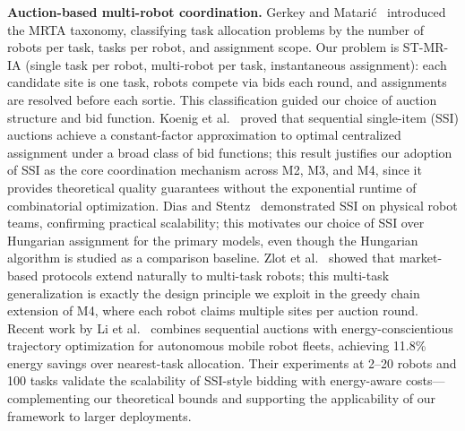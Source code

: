 \documentclass[conference]{IEEEtran}
\begin{document}
\textbf{Auction-based multi-robot coordination.}
Gerkey and Matari\'{c}~\cite{Gerkey2004} introduced the MRTA taxonomy,
classifying task allocation problems by the number of robots per task, tasks
per robot, and assignment scope.
Our problem is ST-MR-IA (single task per robot, multi-robot per task,
instantaneous assignment): each candidate site is one task, robots compete
via bids each round, and assignments are resolved before each sortie.
This classification guided our choice of auction structure and bid function.
Koenig et al.~\cite{Koenig2006} proved that sequential single-item (SSI)
auctions achieve a constant-factor approximation to optimal centralized
assignment under a broad class of bid functions; this result justifies our
adoption of SSI as the core coordination mechanism across M2, M3, and M4,
since it provides theoretical quality guarantees without the exponential
runtime of combinatorial optimization.
Dias and Stentz~\cite{Dias2006} demonstrated SSI on physical robot teams,
confirming practical scalability; this motivates our choice of SSI over
Hungarian assignment for the primary models, even though the Hungarian
algorithm is studied as a comparison baseline.
Zlot et al.~\cite{Zlot2002} showed that market-based protocols extend
naturally to multi-task robots; this multi-task generalization is exactly
the design principle we exploit in the greedy chain extension of M4, where
each robot claims multiple sites per auction round.
Recent work by Li et al.~\cite{Li2026} combines sequential auctions with
energy-conscientious trajectory optimization for autonomous mobile robot
fleets, achieving 11.8\% energy savings over nearest-task allocation.
Their experiments at 2--20 robots and 100 tasks validate the scalability
of SSI-style bidding with energy-aware costs---complementing our theoretical
bounds and supporting the applicability of our framework to larger deployments.
\end{document}
